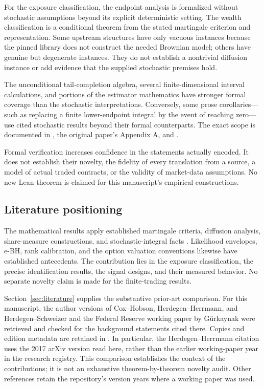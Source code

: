 For the exposure classification, the endpoint analysis is formalized
without stochastic assumptions beyond its explicit deterministic
setting. The wealth classification is a conditional theorem from
the stated martingale criterion and representation. Some upstream
structures have only vacuous instances because the pinned library
does not construct the needed Brownian model; others have genuine
but degenerate instances. They do not establish a nontrivial diffusion
instance or add evidence that the supplied stochastic premises hold.

The unconditional tail-completion algebra, several finite-dimensional
interval calculations, and portions of the estimator mathematics
have stronger formal coverage than the stochastic interpretations.
Conversely, some prose corollaries---such as replacing a finite
lower-endpoint integral by the event of reaching zero---use cited
stochastic results beyond their formal counterparts. The exact scope
is documented in , the original paper's
Appendix A, and .

Formal verification increases confidence in the statements actually
encoded. It does not establish their novelty, the fidelity of every
translation from a source, a model of actual traded contracts, or the
validity of market-data assumptions. No new Lean theorem is claimed
for this manuscript's empirical constructions.

\subsection{Literature positioning}
The mathematical results apply established martingale criteria, diffusion
analysis, share-measure constructions, and stochastic-integral facts
\cite{mijatovic2010martingale,ruf2015martingale,karatzas2015distribution,
kardaras2015strict,etheridge2018continuous}. Likelihood envelopes, e-BH,
rank calibration, and the option valuation conventions likewise have
established antecedents. The contribution lies in the exposure
classification, the precise identification results, the signal designs,
and their measured behavior. No separate novelty claim is made for the
finite-trading results.

Section~\ref{sec:literature} supplies the substantive prior-art comparison.
For this manuscript, the author versions of Cox--Hobson, Herdegen--Herrmann,
and Herdegen--Schweizer and the Federal Reserve working paper by
G\"urkaynak were retrieved and checked for the background statements cited
there. Copies and edition metadata are retained in
. In particular, the Herdegen--Herrmann citation
uses the 2017 arXiv version read here, rather than the earlier working-paper
year in the research registry. This comparison establishes the context of
the contributions; it is not an exhaustive theorem-by-theorem novelty audit.
Other references retain the repository's version years where a working
paper was used.
